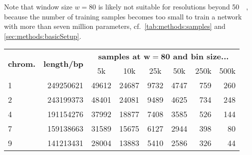 Note that window size $w=80$ is likely not suitable for resolutions beyond \SI{50}{\kilo\bp}, because the number of training samples becomes too small
to train a network with more than seven million parameters, cf.~\cref{tab:methods:samples} and \cref{sec:methods:basicSetup}.
\begin{table}[hbp]
\centering
\begin{tabular}{lrrrrrrr}
\hline
\multicolumn{1}{c}{\multirow{2}{*}{\textbf{chrom.}}} & \multicolumn{1}{c}{\multirow{2}{*}{\textbf{length/bp}}} & \multicolumn{6}{c}{\textbf{samples at $\mathbf{w=80}$ and bin size...}}                                                                                                \\
\multicolumn{1}{c}{}                                     & \multicolumn{1}{c}{}                                    & \multicolumn{1}{c}{5k} & \multicolumn{1}{c}{10k} & \multicolumn{1}{c}{25k} & \multicolumn{1}{c}{50k} & \multicolumn{1}{c}{250k} & \multicolumn{1}{c}{500k} \\ \hline
1                                                        & 249250621                                               & 49612                  & 24687                   & 9732                    & 4747                    & 759                      & 260                      \\
2                                                        & 243199373                                               & 48401                  & 24081                   & 9489                    & 4625                    & 734                      & 248                      \\
4                                                        & 191154276                                               & 37992                  & 18877                   & 7408                    & 3585                    & 526                      & 144                      \\
7                                                        & 159138663                                               & 31589                  & 15675                   & 6127                    & 2944                    & 398                      & 80                       \\
9                                                        & 141213431                                               & 28004                  & 13883                   & 5410                    & 2586                    & 326                      & 44                       \\

\end{tabular}
\end{table}
